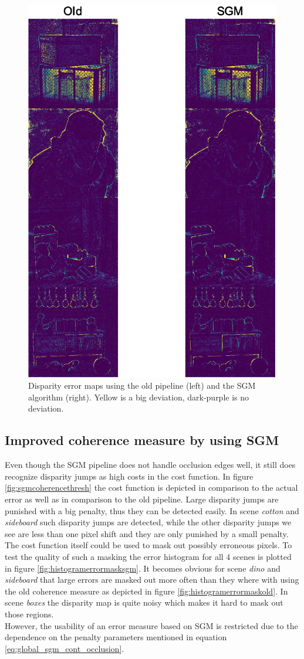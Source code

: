 \documentclass  [
  paper    = a4,
  BCOR     = 10mm,
  twoside,
  fontsize = 12pt,
  fleqn,
  toc      = bibnumbered,
  toc      = listofnumbered,
  numbers  = noendperiod,
  headings = normal,
  listof   = leveldown,
  version  = 3.03
]                                       {scrreprt}
\begin{document}
\begin{figure}[h!]
	\centering
	\includegraphics[width=0.7\linewidth]{images/sgm_results_thresh}
	\caption[Semi-global matching results]{Disparity error maps using the old pipeline (left) and the SGM algorithm (right). Yellow is a big deviation, dark-purple is no deviation.}
	\label{fig:sgmresultsthresh}
\end{figure}





\subsection{Improved coherence measure by using SGM}
Even though the SGM pipeline does not handle occlusion edges well, it still does recognize disparity jumps as high costs in the cost function. In figure \ref{fig:sgmcoherencethresh} the cost function is depicted in comparison to the actual error as well as in comparison to the old pipeline. Large disparity jumps are punished with a big penalty, thus they can be detected easily. In scene \textit{cotton} and \textit{sideboard} such disparity jumps are detected, while the other disparity jumps we see are less than one pixel shift and they are only punished by a small penalty. The cost function itself could be used to mask out possibly erroneous pixels. To test the quality of such a masking the error histogram for all 4 scenes is plotted in figure \ref{fig:histogramerrormasksgm}. It becomes obvious for scene \textit{dino} and \textit{sideboard} that large errors are masked out more often than they where with using the old coherence measure as depicted in figure \ref{fig:histogramerrormaskold}. In scene \textit{boxes} the disparity map is quite noisy which makes it hard to mask out those regions.\\
 However, the usability of an error measure based on SGM is restricted due to the dependence on the penalty parameters mentioned in equation \ref{eq:global_sgm_cont_occlusion}.
\end{document}
